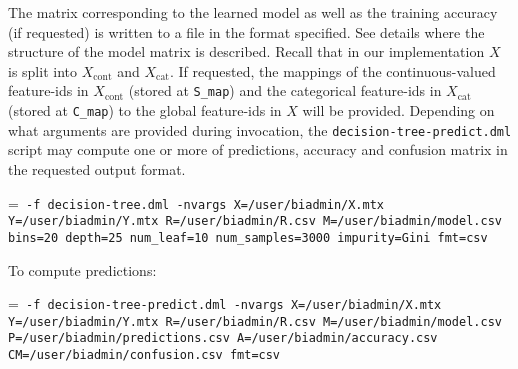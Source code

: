 \smallskip
{}
\smallskip


The matrix corresponding to the learned model as well as the training accuracy (if requested) is written to a file in the format specified. See
details where the structure of the model matrix is described.
Recall that in our implementation $X$ is split into $X_\text{cont}$ and $X_\text{cat}$. If requested, the mappings of the continuous-valued feature-ids in $X_\text{cont}$ (stored at {\tt S\_map}) and the categorical feature-ids in $X_\text{cat}$ (stored at {\tt C\_map}) to the global feature-ids in $X$ will be provided. 
Depending on what arguments are provided during
invocation, the {\tt decision-tree-predict.dml} script may compute one or more of predictions, accuracy and confusion matrix in the requested output format. 

\smallskip
{}
\smallskip

{\hangindent=\parindent\noindent\tt
	\hml -f decision-tree.dml -nvargs X=/user/biadmin/X.mtx Y=/user/biadmin/Y.mtx
	R=/user/biadmin/R.csv M=/user/biadmin/model.csv
	bins=20 depth=25 num\_leaf=10 num\_samples=3000 impurity=Gini fmt=csv
	
}\smallskip


\noindent To compute predictions:

{\hangindent=\parindent\noindent\tt
	\hml -f decision-tree-predict.dml -nvargs X=/user/biadmin/X.mtx Y=/user/biadmin/Y.mtx R=/user/biadmin/R.csv
	M=/user/biadmin/model.csv  P=/user/biadmin/predictions.csv
	A=/user/biadmin/accuracy.csv CM=/user/biadmin/confusion.csv fmt=csv
	
}\smallskip


%
